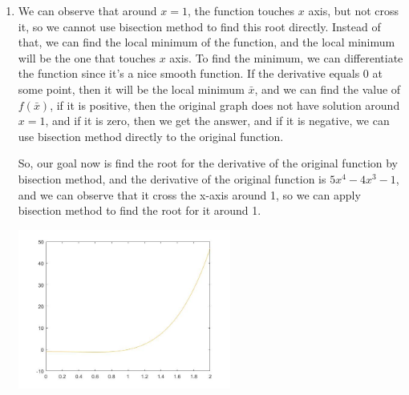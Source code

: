 \documentclass{article}
\begin{document}



\begin{enumerate}
\item 

We can observe that around $x=1$, the function touches $x$ axis, but not cross it, so we cannot use bisection method to find this root directly. Instead of that, we can find the local minimum of the function, and the local minimum will be the one that touches $x$ axis. To find the minimum, we can differentiate the function since it's a nice smooth function. If the derivative equals 0 at some point, then it will be the local minimum $\bar{x}$, and we can find the value of $f(\bar{x})$, if it is positive, then the original graph does not have solution around $x=1$, and if it is zero, then we get the answer, and if it is negative, we can use bisection method directly to the original function.

So, our goal now is find the root for the derivative of the original function by bisection method, and the derivative of the original function is $5x^4-4x^3-1$, and we can observe that it cross the x-axis around 1, so we can apply bisection method to find the root for it around 1.

\includegraphics[width=7cm]{1.jpg}


\end{enumerate}
\end{document}
